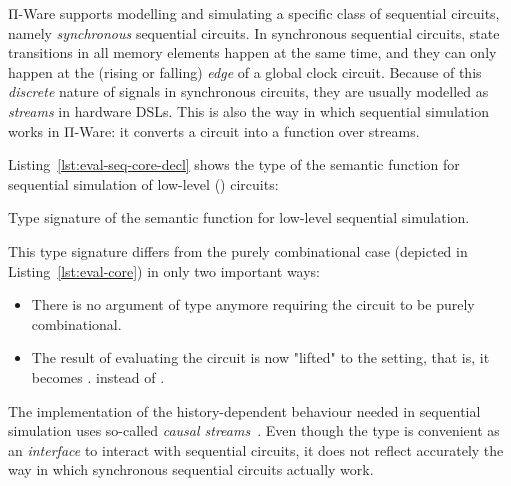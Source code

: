             Π-Ware supports modelling and simulating a specific class of sequential circuits,
            namely \emph{synchronous} sequential circuits.
            In synchronous sequential circuits, state transitions in all memory elements happen
            at the same time, and they can only happen at the (rising or falling) \emph{edge}
            of a global clock circuit.
            Because of this \emph{discrete} nature of signals in synchronous circuits,
            they are usually modelled as \emph{streams} in hardware \acp{DSL}.
            This is also the way in which sequential simulation works in Π-Ware:
            it converts a circuit into a function over streams.

            Listing~\ref{lst:eval-seq-core-decl} shows the type of the semantic function for
            sequential simulation of low-level () circuits:


            \begin{listing}[h]
                \caption{Type signature of the semantic function for low-level sequential simulation.
                    \label{lst:eval-seq-core-decl}}
            \end{listing}

            This type signature differs from the purely combinational case (depicted in Listing~\ref{lst:eval-core})
            in only two important ways:

            \begin{itemize}
                \item There is no argument of type   anymore
                    requiring the circuit to be purely combinational.
                \item The result of evaluating the circuit is now "lifted" to the  setting,
                    that is, it becomes
                     \AY{(} \AY{)}   \AY{(} \AY{)}.
                    instead of     .
            \end{itemize}

            The implementation of the history-dependent behaviour needed in sequential simulation
            uses so-called \emph{causal streams}~\cite{essence-dataflow-programming}.
            Even though the type
             \AY{(} \AY{)}   \AY{(} \AY{)}
            is convenient as an \emph{interface} to interact with sequential circuits, it does not
            reflect accurately the way in which synchronous sequential circuits actually work.

